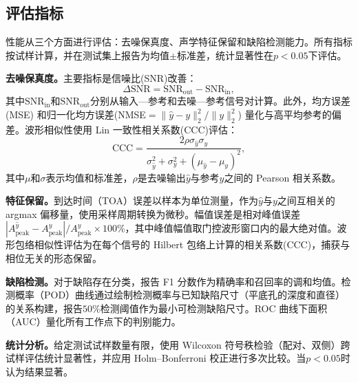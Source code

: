 \subsection{评估指标}
\label{sec:metrics}

性能从三个方面进行评估：去噪保真度、声学特征保留和缺陷检测能力。所有指标按试样计算，并在测试集上报告为均值$\pm$标准差，统计显著性在$p < 0.05$下评估。

\textbf{去噪保真度。}主要指标是信噪比(SNR)改善：
\begin{equation}
\Delta\text{SNR} = \text{SNR}_{\text{out}} - \text{SNR}_{\text{in}},
\end{equation}
其中$\text{SNR}_{\text{in}}$和$\text{SNR}_{\text{out}}$分别从输入—参考和去噪—参考信号对计算。此外，均方误差(MSE) 和归一化均方误差(NMSE$= \| \hat{y} - y \|_2^2 / \| y \|_2^2$) 量化与高平均参考的偏差。波形相似性使用 Lin 一致性相关系数(CCC)评估：
\begin{equation}
\text{CCC} = \frac{2\rho\sigma_{\hat{y}}\sigma_{y}}{\sigma_{\hat{y}}^2 + \sigma_{y}^2 + (\mu_{\hat{y}} - \mu_{y})^2},
\end{equation}
其中$\mu$和$\sigma$表示均值和标准差，$\rho$是去噪输出$\hat{y}$与参考$y$之间的 Pearson 相关系数。

\textbf{特征保留。}到达时间（TOA）误差以样本为单位测量，作为$\hat{y}$与$y$之间互相关的 argmax 偏移量，使用采样周期转换为微秒。幅值误差是相对峰值误差$|A_{\text{peak}}^{\hat{y}} - A_{\text{peak}}^{y}| / A_{\text{peak}}^{y} \times 100\%$，其中峰值幅值取门控波形窗口内的最大绝对值。波形包络相似性评估为在每个信号的 Hilbert 包络上计算的相关系数(CCC)，捕获与相位无关的形态保留。

\textbf{缺陷检测。}对于缺陷存在分类，报告 F1 分数作为精确率和召回率的调和均值。检测概率（POD）曲线通过绘制检测概率与已知缺陷尺寸（平底孔的深度和直径）的关系构建，报告$50\%$检测阈值作为最小可检测缺陷尺寸。ROC 曲线下面积（AUC）量化所有工作点下的判别能力。

\textbf{统计分析。}给定测试试样数量有限，使用 Wilcoxon 符号秩检验（配对、双侧）跨试样评估统计显著性，并应用 Holm--Bonferroni 校正进行多次比较。当$p < 0.05$时认为结果显著。